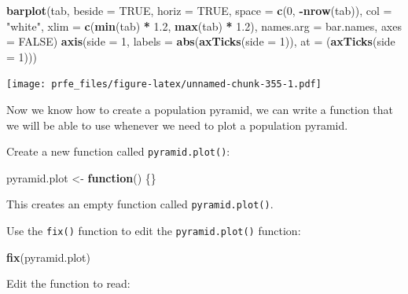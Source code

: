 \documentclass[12pt,a4paper]{book}
\newenvironment{Shaded}{\begin{snugshade}}{\end{snugshade}}
\newcommand{\KeywordTok}[1]{\textcolor[rgb]{0.13,0.29,0.53}{\textbf{#1}}}
\newcommand{\DataTypeTok}[1]{\textcolor[rgb]{0.13,0.29,0.53}{#1}}
\newcommand{\DecValTok}[1]{\textcolor[rgb]{0.00,0.00,0.81}{#1}}
\newcommand{\FloatTok}[1]{\textcolor[rgb]{0.00,0.00,0.81}{#1}}
\newcommand{\StringTok}[1]{\textcolor[rgb]{0.31,0.60,0.02}{#1}}
\newcommand{\OtherTok}[1]{\textcolor[rgb]{0.56,0.35,0.01}{#1}}
\newcommand{\ControlFlowTok}[1]{\textcolor[rgb]{0.13,0.29,0.53}{\textbf{#1}}}
\newcommand{\OperatorTok}[1]{\textcolor[rgb]{0.81,0.36,0.00}{\textbf{#1}}}
\newcommand{\NormalTok}[1]{#1}
\theoremstyle{definition}
\theoremstyle{definition}
\theoremstyle{definition}
\theoremstyle{remark}
\begin{document}
\begin{Shaded}
\begin{Highlighting}[]
\KeywordTok{barplot}\NormalTok{(tab, }\DataTypeTok{beside =} \OtherTok{TRUE}\NormalTok{, }\DataTypeTok{horiz =} \OtherTok{TRUE}\NormalTok{, }\DataTypeTok{space =} \KeywordTok{c}\NormalTok{(}\DecValTok{0}\NormalTok{, }\OperatorTok{-}\KeywordTok{nrow}\NormalTok{(tab)),}
        \DataTypeTok{col =} \StringTok{"white"}\NormalTok{, }\DataTypeTok{xlim =} \KeywordTok{c}\NormalTok{(}\KeywordTok{min}\NormalTok{(tab) }\OperatorTok{*}\StringTok{ }\FloatTok{1.2}\NormalTok{, }\KeywordTok{max}\NormalTok{(tab) }\OperatorTok{*}\StringTok{ }\FloatTok{1.2}\NormalTok{),}
        \DataTypeTok{names.arg =}\NormalTok{ bar.names, }\DataTypeTok{axes =} \OtherTok{FALSE}\NormalTok{)}
\KeywordTok{axis}\NormalTok{(}\DataTypeTok{side =} \DecValTok{1}\NormalTok{,}
     \DataTypeTok{labels =} \KeywordTok{abs}\NormalTok{(}\KeywordTok{axTicks}\NormalTok{(}\DataTypeTok{side =} \DecValTok{1}\NormalTok{)),}
     \DataTypeTok{at =}\NormalTok{ (}\KeywordTok{axTicks}\NormalTok{(}\DataTypeTok{side =} \DecValTok{1}\NormalTok{)))}
\end{Highlighting}
\end{Shaded}

\texttt{[image: prfe\_files/figure-latex/unnamed-chunk-355-1.pdf]}

Now we know how to create a population pyramid, we can write a function
that we will be able to use whenever we need to plot a population
pyramid.

Create a new function called \texttt{pyramid.plot()}:

\begin{Shaded}
\begin{Highlighting}[]
\NormalTok{pyramid.plot <-}\StringTok{ }\ControlFlowTok{function}\NormalTok{() \{\}}
\end{Highlighting}
\end{Shaded}

This creates an empty function called \texttt{pyramid.plot()}.

Use the \texttt{fix()} function to edit the \texttt{pyramid.plot()}
function:

\begin{Shaded}
\begin{Highlighting}[]
\KeywordTok{fix}\NormalTok{(pyramid.plot)}
\end{Highlighting}
\end{Shaded}

Edit the function to read:
\end{document}
